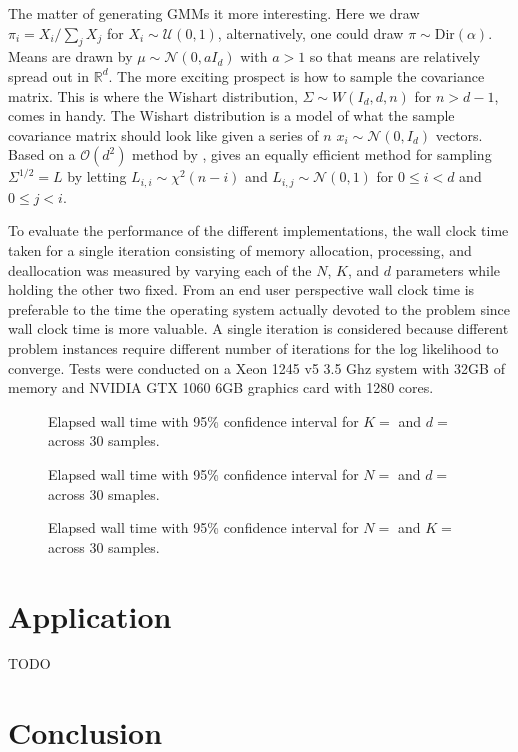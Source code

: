 \documentclass{article}
\newcommand{\boundedBy}[1]{\mathcal{O} \left ( #1 \right )}
\begin{document}
The matter of generating GMMs it more interesting. Here we draw $\pi_i = X_i / \sum_{j} X_j$ for $X_i \sim \mathcal{U}(0, 1)$, alternatively, one could draw $\pi \sim \text{Dir}(\alpha)$. Means are drawn by $\mu \sim \mathcal{N}(0, a I_d)$ with $a > 1$ so that means are relatively spread out in $\mathbb{R}^{d}$. The more exciting prospect is how to sample the covariance matrix. This is where the Wishart distribution, $\Sigma \sim W(I_d, d, n)$ for $n > d - 1$, comes in handy. The Wishart distribution is a model of what the sample covariance matrix should look like given a series of $n$ $x_i \sim \mathcal{N}(0, I_d)$ vectors. Based on a $\boundedBy{d^2}$ method by \cite{odell1966numerical}, \cite{sawyer2007wishart} gives an equally efficient method for sampling $\Sigma^{1/2} = L$ by letting $L_{i,i} \sim \chi^2(n - i)$ and $L_{i,j} \sim \mathcal{N}(0, 1)$ for $0 \le i < d$ and $0 \le j < i$. 

To evaluate the performance of the different implementations, the wall clock time taken for a single iteration consisting of memory allocation, processing, and deallocation was measured by varying each of the $N$, $K$, and $d$ parameters while holding the other two fixed. From an end user perspective wall clock time is preferable to the time the operating system actually devoted to the problem since wall clock time is more valuable. A single iteration is considered because different problem instances require different number of iterations for the log likelihood to converge. Tests were conducted on a Xeon 1245 v5 3.5 Ghz system with 32GB of memory and NVIDIA GTX 1060 6GB graphics card with 1280 cores.

\begin{multicols}{2}
\begin{figure}[H]
	\centering
	\resizebox{\linewidth}{!}{}
	\caption{Elapsed wall time with 95\% confidence interval for $K = $ and $d = $ across 30 samples.}
	\label{fig:timeNumPoints}
\end{figure}

\begin{figure}[H]
	\centering
	\resizebox{\linewidth}{!}{}
	\caption{Elapsed wall time with 95\% confidence interval for $N = $ and $d = $ across 30 smaples.}
	\label{fig:timeNumComponents}
\end{figure}

\columnbreak

\begin{figure}[H]
	\centering
	\resizebox{\linewidth}{!}{}
	\caption{Elapsed wall time with 95\% confidence interval for $N = $ and $K = $ across 30 samples.}
	\label{fig:timePointDim}
\end{figure}
\end{multicols}

\section{Application}

TODO

\section{Conclusion}



\end{document}
